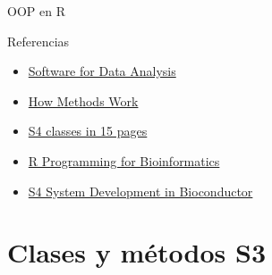 \documentclass[xcolor={usenames,svgnames,dvipsnames}]{beamer}
\begin{document}
\begin{frame}[label=sec-1-1-2]{OOP en R}
\begin{block}{Referencias}
\begin{center}
\begin{itemize}
\item \href{http://books.google.es/books/about/Software_for_Data_Analysis.html}{Software for Data Analysis}
\item \href{http://developer.r-project.org/howMethodsWork.pdf}{How Methods Work}
\item \href{http://www.stat.auckland.ac.nz/S-Workshop/Gentleman/S4Objects.pdf}{S4 classes in 15 pages}
\item \href{http://bioconductor.org/help/publications/books/r-programming-for-bioinformatics/}{R Programming for Bioinformatics }
\item \href{http://bioconductor.org/help/course-materials/2010/AdvancedR/S4InBioconductor.pdf}{S4 System Development in Bioconductor}
\end{itemize}
\end{center}
\end{block}
\end{frame}
\section{Clases y métodos S3}
\label{sec-2}
\end{document}
